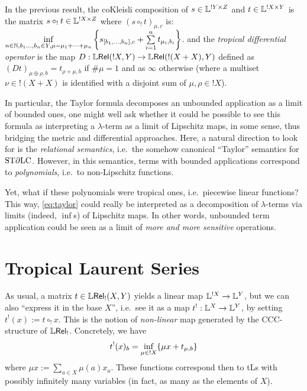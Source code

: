 \documentclass[submission,%
]{eptcs}
\begin{document}
In the previous result, the coKleisli composition of $s\in\mathbb{L}^{!Y\times Z}$ and $t\in\mathbb{L}^{!X\times Y}$ is the matrix $s\circ_! t\in\mathbb{L}^{!X\times Z}$ where $(s\circ_! t)_{\mu,c}$ is:
$
 \inf\limits_{n\in\mathbb{N}, b_1\dots,b_n\in Y, \mu = \mu_1+\cdots +\mu_n}
 \left\{s_{[b_1,\dots,b_n],c} + \sum\limits_{i=1}^n t_{\mu_i,b_i}\right\}$.
and the \emph{tropical differential operator} is the map $D:{\mathbb{L} \mathsf{Rel}}(!X,Y)\to {\mathbb{L}\mathsf{Rel}}(!(X+X),Y)$ defined as $(Dt)_{\mu\oplus\rho,b}=t_{\rho+\mu,b}$ if $\#\mu=1$ and as $\infty$ otherwise (where a multiset $\nu \in !(X+X)$ is identified with a disjoint sum of $\mu,\rho\in !X$).


In particular, the Taylor formula decomposes an unbounded application as a limit of bounded ones, one might well ask whether it could be possible to see this formula as interpreting  a $\lambda$-term 
as a limit of Lipschitz maps, in some sense, thus bridging the metric and differential approaches.  
Here, a natural direction to look for is the \emph{relational semantics}, i.e.~the somehow canonical ``Taylor'' semantics for $\mathrm{ST}\partial\mathrm{LC}$. 
However, in this semantics, terms with bounded applications correspond to \emph{polynomials}, i.e.~to non-Lipschitz functions. 

Yet, what if these polynomials were tropical ones, i.e.~piecewise linear functions? This way, \eqref{eq:taylor} could really be interpreted as a decomposition of $\lambda$-terms via limits (indeed, $\inf$s) of Lipschitz maps. In other words, unbounded term application could be seen 
as a limit of \emph{more and more sensitive} operations. 

\section{Tropical Laurent Series}

 As usual, a matrix $t\in{\mathbb{L}\mathsf{Rel}_!}(X,Y)$ yields a linear map $\mathbb{L}^{!X}\to\mathbb{L}^Y$, but we can also ``express it in the base $X$'', i.e.\ see it as a map $t^!:\mathbb{L}^X\to\mathbb{L}^Y$, by setting 
 $t^!(x):=t\circ_! x$.
 This is the notion of \emph{non-linear} map generated by the CCC-structure of $\mathbb{L} \mathsf{Rel}_!$.
 Concretely, we have
 \begin{equation}
 t^!(x)_b=\inf\limits_{\mu\in !X} \{\mu x+ t_{\mu,b}\}
 \end{equation}
 where $\mu x:=\sum\limits_{a\in X} \mu(a)x_a$.
 These functions correspond then to tLs with possibly infinitely many variables (in fact, as many as the elements of $X$). 
\end{document}
